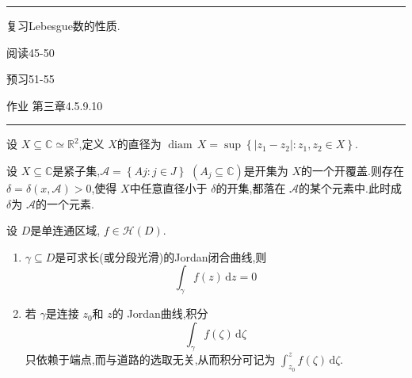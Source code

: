 \documentclass[../../复变函数.tex]{subfiles}
\begin{document}
\hspace*{\fill} 
\hrule
\hspace*{\fill}


复习Lebesgue数的性质.

阅读45-50

预习51-55

作业 第三章4.5.9.10


\hspace*{\fill} 
\hrule
\hspace*{\fill}

\begin{definition}
    设 \(  X\subseteq \mathbb{C} \simeq \mathbb{R} ^{2}  \),定义 \(  X  \)的直径为 \(  \operatorname{diam}\,X= \sup \left\{ \left| z_1-z_2 \right|: z_1,z_2 \in X  \right\}  \).   
\end{definition}
\begin{lemma}
    设 \(  X\subseteq \mathbb{C}   \)是紧子集,\(  \mathscr{A}= \left\{ Aj : j \in J\right\}  \) \(  \left( A_{j}\subseteq \mathbb{C}  \right)\text{是开集}  \)为 \(  X  \)的一个开覆盖.则存在 \(   \delta  =  \delta  \left( x,\mathscr{A} \right)> 0   \),使得 \(  X  \)中任意直径小于 \(   \delta    \)的开集,都落在 \(  \mathscr{A}  \)的某个元素中.此时成 \(   \delta    \)为 \(  \mathscr{A}  \)的一个元素.          
\end{lemma}
\begin{theorem}
    设 \(  D  \)是单连通区域, \(  f \in \mathcal{H}\left( D \right)   \).
    \begin{enumerate}
        \item \(   \gamma \subseteq D  \)是可求长(或分段光滑)的Jordan闭合曲线,则 \[
        \int_{ \gamma }f\left( z \right)\,\mathrm{d} z= 0 
        \] 
        \item 若 \(   \gamma   \)是连接 \(  z_0  \)和 \(  z  \)的 Jordan曲线,积分 \[
        \int_{ \gamma }f\left( \zeta  \right)\,\mathrm{d} \zeta  
        \]    只依赖于端点,而与道路的选取无关,从而积分可记为 \(  \int_{z_0}^{z}f\left( \zeta  \right)\,\mathrm{d} \zeta    \). 
    \end{enumerate}
      
\end{theorem}
\end{document}
